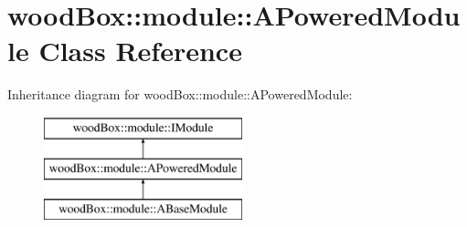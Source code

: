 \hypertarget{classwood_box_1_1module_1_1_a_powered_module}{}\section{wood\+Box\+:\+:module\+:\+:A\+Powered\+Module Class Reference}
\label{classwood_box_1_1module_1_1_a_powered_module}
Inheritance diagram for wood\+Box\+:\+:module\+:\+:A\+Powered\+Module\+:\begin{figure}[H]
\begin{center}
\leavevmode
\includegraphics[height=3.000000cm]{classwood_box_1_1module_1_1_a_powered_module}
\end{center}
\end{figure}
